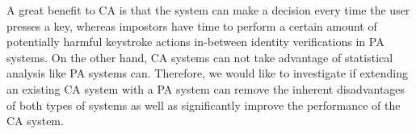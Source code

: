 \documentclass[informationsecurity]{gucmasterproject}
\begin{document}
A great benefit to CA is that the system can make a decision every time the user presses a key, whereas impostors have time to perform a certain amount of potentially harmful keystroke actions in-between identity verifications in PA systems.
On the other hand, CA systems can not take advantage of statistical analysis like PA systems can.
Therefore, we would like to investigate if extending an existing CA system with a PA system can remove the inherent disadvantages of both types of systems as well as significantly improve the performance of the CA system.


%
%
\end{document}
